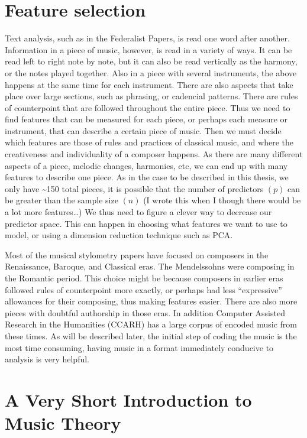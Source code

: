 \documentclass[12pt,twoside]{reedthesis}
\theoremstyle{definition}
\theoremstyle{definition}
\theoremstyle{definition}
\theoremstyle{remark}
\begin{document}
\section{Feature selection}\label{feature-selection}

Text analysis, such as in the Federalist Papers, is read one word after
another. Information in a piece of music, however, is read in a variety
of ways. It can be read left to right note by note, but it can also be
read vertically as the harmony, or the notes played together. Also in a
piece with several instruments, the above happens at the same time for
each instrument. There are also aspects that take place over large
sections, such as phrasing, or cadencial patterns. There are rules of
counterpoint that are followed throughout the entire piece. Thus we need
to find features that can be measured for each piece, or perhaps each
measure or instrument, that can describe a certain piece of music. Then
we must decide which features are those of rules and practices of
classical music, and where the creativeness and individuality of a
composer happens. As there are many different aspects of a piece,
melodic changes, harmonies, etc, we can end up with many features to
describe one piece. As in the case to be described in this thesis, we
only have \textasciitilde{}150 total pieces, it is possible that the
number of predictors \((p)\) can be greater than the sample size \((n)\)
(I wrote this when I though there would be a lot more features\ldots{})
We thus need to figure a clever way to decrease our predictor space.
This can happen in choosing what features we want to use to model, or
using a dimension reduction technique such as PCA.

Most of the musical stylometry papers have focused on composers in the
Renaissance, Baroque, and Classical eras. The Mendelssohns were
composing in the Romantic period. This choice might be because composers
in earlier eras followed rules of counterpoint more exactly, or perhaps
had less ``expressive'' allowances for their composing, thus making
features easier. There are also more pieces with doubtful authorship in
those eras. In addition Computer Assisted Research in the Humanities
(CCARH) has a large corpus of encoded music from these times. As will be
described later, the initial step of coding the music is the most time
consuming, having music in a format immediately conducive to analysis is
very helpful.

\section{A Very Short Introduction to Music
Theory}\label{a-very-short-introduction-to-music-theory}
\end{document}
